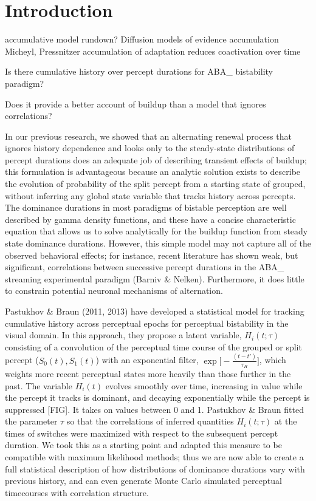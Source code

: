 \section{Introduction}
accumulative model rundown?
Diffusion models of evidence accumulation
Micheyl, Pressnitzer accumulation of adaptation reduces coactivation over time


Is there cumulative history over percept durations for ABA\_ bistability paradigm?

Does it provide a better account of buildup than a model that ignores correlations?

In our previous research, we showed that an alternating renewal process that ignores history dependence and looks only to the steady-state distributions of percept durations does an adequate job of describing transient effects of buildup; this formulation is advantageous because an analytic solution exists to describe the evolution of probability of the split percept from a starting state of grouped, without inferring any global state variable that tracks history across percepts. The dominance durations in most paradigms of bistable perception are well described by gamma density functions, and these have a concise characteristic equation that allows us to solve analytically for the buildup function from steady state dominance durations. However, this simple model may not capture all of the observed behavioral effects; for instance, recent literature has shown weak, but significant, correlations between successive percept durations in the ABA\_ streaming experimental paradigm (Barniv \& Nelken). Furthermore, it does little to constrain potential neuronal mechanisms of alternation. 


Pastukhov \& Braun (2011, 2013) have developed a statistical model for tracking cumulative history across perceptual epochs for perceptual bistability in the visual domain. In this approach, they propose a latent variable, $H_i(t; \tau)$ consisting of a convolution of the perceptual time course of the grouped or split percept ($S_0(t), S_1(t)$) with an exponential filter, $\exp \big [- \frac{(t-t')}{\tau_H} \big ]$, which weights more recent perceptual states more heavily than those further in the past. The variable $H_i(t)$ evolves smoothly over time, increasing in value while the percept it tracks is dominant, and decaying exponentially while the percept is suppressed [FIG]. It takes on values between 0 and 1. Pastukhov \& Braun fitted the parameter $\tau$ so that the correlations of inferred quantities $H_i(t; \tau)$ at the times of switches were maximized with respect to the subsequent percept duration. We took this as a starting point and adapted this measure to be compatible with maximum likelihood methods; thus we are now able to create a full statistical description of how distributions of dominance durations vary with previous history, and can even generate Monte Carlo simulated perceptual timecourses with correlation structure.

